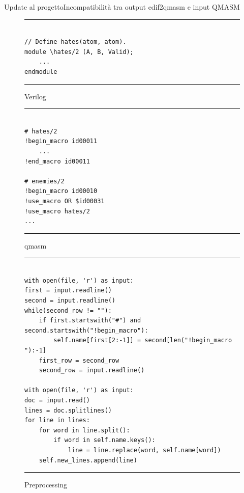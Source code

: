 \begin{frame}[fragile]{Update al progetto}{Incompatibilità tra output edif2qmasm e input QMASM}
	\begin{minipage}{.31\linewidth}
		\begin{figure}
			\begin{minipage}{.95\linewidth}
				\hrule
				\begin{verbatim}
					
// Define hates(atom, atom).
module \hates/2 (A, B, Valid);
	...
endmodule
				\end{verbatim}
				\hrule
			\end{minipage}
			\caption{Verilog}
		\end{figure}
		\vspace{-.6cm}
		\begin{figure}
			\begin{minipage}{.95\linewidth}
				\hrule
				\begin{verbatim}
					
# hates/2
!begin_macro id00011
	...
!end_macro id00011

# enemies/2
!begin_macro id00010
!use_macro OR $id00031
!use_macro hates/2
...
				\end{verbatim}
				\hrule
				\caption{qmasm}
			\end{minipage}
		\end{figure}
	\end{minipage}
	\hfill
	\begin{minipage}{.67\linewidth}
		\begin{figure}
			\begin{minipage}{.95\linewidth}
				\hrule
				\begin{verbatim}
					
with open(file, 'r') as input:
first = input.readline()
second = input.readline()
while(second_row != ""):
	if first.startswith("#") and second.startswith("!begin_macro"):
		self.name[first[2:-1]] = second[len("!begin_macro "):-1]
	first_row = second_row
	second_row = input.readline()

with open(file, 'r') as input:
doc = input.read()
lines = doc.splitlines()
for line in lines:
	for word in line.split():
		if word in self.name.keys():
			line = line.replace(word, self.name[word])
	self.new_lines.append(line)
				\end{verbatim}
				\hrule
			\end{minipage}
			\caption{Preprocessing}
		\end{figure}
	\end{minipage}
\end{frame}


